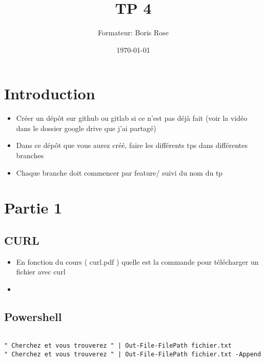 \documentclass[12pt, letterpaper]{article}
\title{TP 4}
\author{Formateur: Boris Rose}
\date{\today}
\begin{document}
\maketitle

\section*{Introduction}

\begin{tcolorbox}[colback=brown!5,colframe=brown!60!black,title=Consignes]

\begin{itemize}
    \item Créer un dépôt sur github ou gitlab si ce n'est pas déjà fait (voir la vidéo dans le dossier google drive que j'ai partagé)
    \item Dans ce dépôt que vous aurez créé, faire les différents tps dans différentes branches
    \item Chaque branche doit commencer par feature/ suivi du nom du tp 
\end{itemize}


\end{tcolorbox}


\section*{Partie 1}


\subsection*{CURL}

\begin{itemize}
    \item En fonction du cours ( curl.pdf ) quelle est la commande pour télécharger un fichier avec curl 
    \item 
\end{itemize}


\subsection*{Powershell}

\begin{verbatim}

" Cherchez et vous trouverez " | Out-File-FilePath fichier.txt
" Cherchez et vous trouverez " | Out-File-FilePath fichier.txt -Append
    
\end{verbatim}
\end{document}

